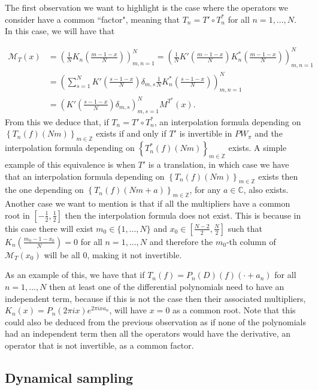 \documentclass[reqno]{amsart}
\theoremstyle{plain}
\theoremstyle{definition}
\numberwithin{equation}{section}
\newcommand{\Z}{{\mathbb Z}}
\newcommand{\C}{{\mathbb C}}
\newcommand{\pa}[1]{\left(#1\right)}
\newcommand{\suc}[1]{\left\{#1\right\}}
\begin{document}
The first observation we want to highlight is the case where the operators we consider have a common ``factor", meaning that $T_n=T'\circ T_n^*$ for all $n=1,...,N$. In this case, we will have that

\begin{align*}
    \mathcal{M}_T(x)
    &=\pa{\frac{1}{N} K_n\pa{\frac{m-1-x}{N}}}_{m,n=1}^N
    = \pa{\frac{1}{N} K' \pa{\frac{m-1-x}{N}}K^*_n\pa{\frac{m-1-x}{N}}}_{m,n=1}^N \\
    &= \pa{ \sum_{s=1}^N K' \pa{\frac{s-1-x}{N}} \delta_{m,s} \frac{1}{N}K^*_n\pa{\frac{s-1-x}{N}}}_{m,n=1}^N \\
    &= \pa{K' \pa{\frac{s-1-x}{N}} \delta_{m,s}}_{m,s=1}^N M^{T^*}(x).
\end{align*}
From this we deduce that, if $T_n=T'\circ T_n^*$, an interpolation formula depending on $\suc{T_n(f)(Nm)}_{m\in\Z}$ exists if and only if $T'$ is invertible in $PW_\pi$ and the interpolation formula depending on $\suc{T^*_n(f)(Nm)}_{m\in\Z}$ exists. A simple example of this equivalence is when $T'$ is a translation, in which case we have that an interpolation formula depending on $\suc{T_n(f)(Nm)}_{m\in\Z}$ exists then the one depending on $\suc{T_n(f)(Nm+a)}_{m\in\Z}$, 
for any $a\in\C$, also exists. \\

Another case we want to mention is that if all the multipliers have a common root in 
$\left[-\frac{1}{2},\frac{1}{2}\right]$ then the interpolation formula does not exist. This is because in this case there will exist $m_0\in\{1,...,N\}$ and $x_0\in\left[\frac{N-2}{2},\frac{N}{2}\right]$ such that $K_n\pa{\frac{m_0-1-x_0}{N}}=0$ for all $n=1,...,N$ and therefore the $m_0$-th column of $\mathcal{M}_T(x_0)$ will be all 0, making it not invertible. 

As an example of this, we have that if $T_n(f)=P_n(D)(f)(\cdot+a_n)$ for all $n=1,...,N$ then at least one of the differential polynomials need to have an independent term, because if this is not the case then their associated multipliers, $K_n(x)=P_n(2\pi i x) e^{2\pi i x a_n}$, will have $x=0$ as a common root. Note that this could also be deduced from the previous observation as if none of the polynomials had an independent term then all the operators would have the derivative, an operator that is not invertible, as a common factor.

\subsection{Dynamical sampling}
\end{document}

